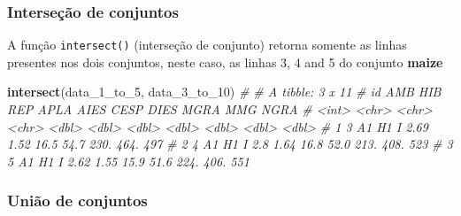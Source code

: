 \documentclass[
]{book}
\newenvironment{Shaded}{\begin{snugshade}}{\end{snugshade}}
\newcommand{\CommentTok}[1]{\textcolor[rgb]{0.56,0.35,0.01}{\textit{#1}}}
\newcommand{\DataTypeTok}[1]{\textcolor[rgb]{0.13,0.29,0.53}{#1}}
\newcommand{\DecValTok}[1]{\textcolor[rgb]{0.00,0.00,0.81}{#1}}
\newcommand{\KeywordTok}[1]{\textcolor[rgb]{0.13,0.29,0.53}{\textbf{#1}}}
\newcommand{\NormalTok}[1]{#1}
\newcommand{\OperatorTok}[1]{\textcolor[rgb]{0.81,0.36,0.00}{\textbf{#1}}}
\newcommand{\StringTok}[1]{\textcolor[rgb]{0.31,0.60,0.02}{#1}}
\begin{document}
\begin{Shaded}
\end{Shaded}

\hypertarget{interseuxe7uxe3o-de-conjuntos}{%
\subsubsection{Interseção de conjuntos}\label{interseuxe7uxe3o-de-conjuntos}}

A função \texttt{intersect()} (interseção de conjunto) retorna somente as linhas presentes nos dois conjuntos, neste caso, as linhas 3, 4 and 5 do conjunto \textbf{maize}

\begin{Shaded}
\begin{Highlighting}[]
\KeywordTok{intersect}\NormalTok{(data_}\DecValTok{1}\NormalTok{_to_}\DecValTok{5}\NormalTok{, data_}\DecValTok{3}\NormalTok{_to_}\DecValTok{10}\NormalTok{)}
\CommentTok{# # A tibble: 3 x 11}
\CommentTok{#      id AMB   HIB   REP    APLA  AIES  CESP  DIES  MGRA   MMG  NGRA}
\CommentTok{#   <int> <chr> <chr> <chr> <dbl> <dbl> <dbl> <dbl> <dbl> <dbl> <dbl>}
\CommentTok{# 1     3 A1    H1    I      2.69  1.52  16.5  54.7  230.  464.   497}
\CommentTok{# 2     4 A1    H1    I      2.8   1.64  16.8  52.0  213.  408.   523}
\CommentTok{# 3     5 A1    H1    I      2.62  1.55  15.9  51.6  224.  406.   551}
\end{Highlighting}
\end{Shaded}

\hypertarget{uniuxe3o-de-conjuntos}{%
\subsubsection{União de conjuntos}\label{uniuxe3o-de-conjuntos}}
\end{document}
